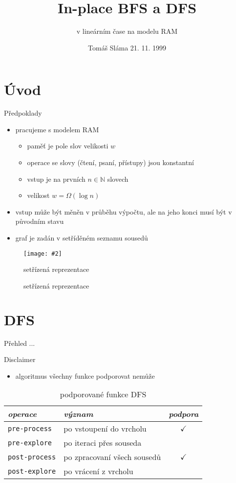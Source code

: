 \documentclass[czech]{beamer}
\title{In-place BFS a DFS}
\subtitle{v lineárním čase na modelu RAM}
\date{Tomáš Sláma \hfill 21. 11. 1999} %
\makeatletter
\newcommand{\fitimage}[2][\@nil]{
	\begin{figure}
		\begin{adjustbox}{width=0.9\textwidth, totalheight=\textheight-2\baselineskip-2\baselineskip,keepaspectratio}
			\texttt{[image: \#2]}
		\end{adjustbox}
		\def\tmp{#1}%
	 \ifx\tmp\@nnil
			\else
			\caption{#1}
		\fi
	\end{figure}
}
\makeatother
\begin{document}
	\begin{frame}
		\maketitle
	\end{frame}
	
	\section{Úvod}
	\begin{frame}{Předpoklady}
		\begin{itemize}
			\item pracujeme s modelem RAM
			\begin{itemize}
				\item paměť je pole slov velikosti $w$
				\item operace se slovy (čtení, psaní, přístupy) jsou konstantní
				\item vstup je na prvních $n \in \mathbb{N}$ slovech
				\item velikost $w = \Omega\left(\log n\right)$
			\end{itemize}
			\vfill
			\item vstup může být měněn v průběhu výpočtu, ale na jeho konci musí být v původním stavu
			\vfill
			\item graf je zadán v setříděném seznamu sousedů
		\end{itemize}

		\fitimage[setřízená reprezentace]{images/sorted.png}
	\end{frame}

	\section{DFS}
	\begin{frame}{Přehled}
		...
	\end{frame}

	\begin{frame}{Disclaimer}
		\begin{itemize}
			\item algoritmus všechny funkce podporovat nemůže
		\end{itemize}

		\begin{table}
			\centering
			\begin{tabular}{llc}
				\toprule
				\emph{operace} & \emph{význam} & \emph{podpora} \\
				\midrule
				\texttt{pre-process} & po vstoupení do vrcholu & $\checkmark$ \\
				\texttt{pre-explore} & po iteraci přes souseda &  \\
				\texttt{post-process} & po zpracovaní všech sousedů & $\checkmark$ \\
				\texttt{post-explore} & po vrácení z vrcholu &  \\
				\bottomrule
			\end{tabular}
			\caption{podporované funkce DFS}
		\end{table}
	\end{frame}
\end{document}
